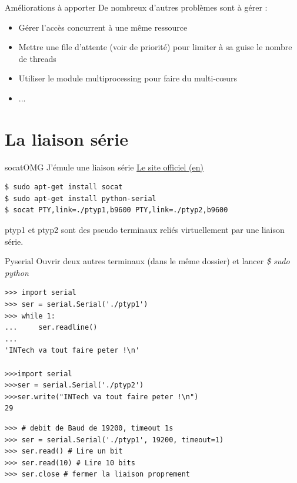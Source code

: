 \documentclass{beamer}
\begin{document}
\begin{frame}[fragile]{Améliorations à apporter}
De nombreux d'autres problèmes sont à gérer :
\begin{itemize}
 \item Gérer l'accès concurrent à une même ressource
 \item Mettre une file d'attente (voir de priorité) pour limiter à sa guise le nombre de threads
 \item Utiliser le module multiprocessing pour faire du multi-c\oe{}urs
 \item ...
\end{itemize}
\end{frame}


\section{La liaison série}

\begin{frame}[fragile]{socat}{OMG J'émule une liaison série}
\href{http://pyserial.sourceforge.net/}{Le site officiel (en)}
\begin{lstlisting}[language=bash]
$ sudo apt-get install socat
$ sudo apt-get install python-serial
$ socat PTY,link=./ptyp1,b9600 PTY,link=./ptyp2,b9600
\end{lstlisting}
ptyp1 et ptyp2 sont des pseudo terminaux reliés virtuellement par une liaison série.\\
\end{frame}

\begin{frame}[fragile]{Pyserial}
Ouvrir deux autres terminaux (dans le même dossier) et lancer \textit{\$ sudo python}
\begin{lstlisting}[basicstyle=\tiny, multicols=2]
>>> import serial
>>> ser = serial.Serial('./ptyp1')
>>> while 1:
...     ser.readline()
...
'INTech va tout faire peter !\n'

>>>import serial
>>>ser = serial.Serial('./ptyp2')
>>>ser.write("INTech va tout faire peter !\n")
29
\end{lstlisting}
\begin{lstlisting}[basicstyle=\tiny]
>>> # debit de Baud de 19200, timeout 1s
>>> ser = serial.Serial('./ptyp1', 19200, timeout=1)
>>> ser.read() # Lire un bit
>>> ser.read(10) # Lire 10 bits
>>> ser.close # fermer la liaison proprement
\end{lstlisting}

\end{frame}
\end{document}
